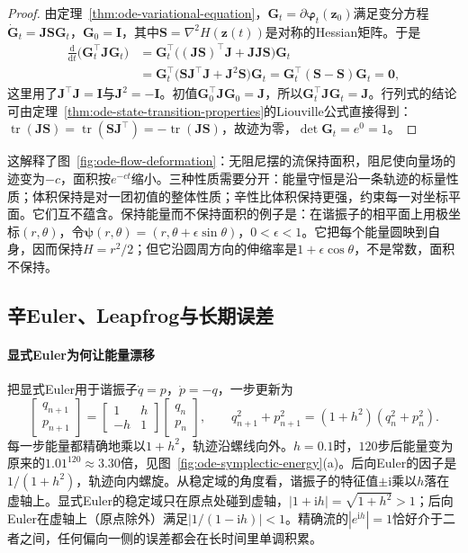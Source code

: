 \begin{proof}
  由定理~\ref{thm:ode-variational-equation}，$\bm G_t=\partial\bm\varphi_t(\bm z_0)$满足变分方程$\dot{\bm G}_t=\bm J\bm S\bm G_t$，$\bm G_0=\bm I$，其中$\bm S=\nabla^2H(\bm z(t))$是对称的Hessian矩阵。于是
  \[
    \begin{aligned}
    \frac{\mathrm d}{\mathrm dt}\bigl(\bm G_t^\top\bm J\bm G_t\bigr)&=\bm G_t^\top\bigl((\bm J\bm S)^\top\bm J+\bm J\bm J\bm S\bigr)\bm G_t\\
    &=\bm G_t^\top\bigl(\bm S\bm J^\top\bm J+\bm J^2\bm S\bigr)\bm G_t=\bm G_t^\top(\bm S-\bm S)\bm G_t=\bm0,
    \end{aligned}
  \]
  这里用了$\bm J^\top\bm J=\bm I$与$\bm J^2=-\bm I$。初值$\bm G_0^\top\bm J\bm G_0=\bm J$，所以$\bm G_t^\top\bm J\bm G_t=\bm J$。行列式的结论可由定理~\ref{thm:ode-state-transition-properties}的Liouville公式直接得到：$\operatorname{tr}(\bm J\bm S)=\operatorname{tr}(\bm S\bm J^\top)=-\operatorname{tr}(\bm J\bm S)$，故迹为零，$\det\bm G_t=e^0=1$。
\end{proof}

这解释了图~\ref{fig:ode-flow-deformation}：无阻尼摆的流保持面积，阻尼使向量场的迹变为$-c$，面积按$e^{-ct}$缩小。三种性质需要分开：能量守恒是沿一条轨迹的标量性质；体积保持是对一团初值的整体性质；辛性比体积保持更强，约束每一对坐标平面。它们互不蕴含。保持能量而不保持面积的例子是：在谐振子的相平面上用极坐标$(r,\theta)$，令$\bm\psi(r,\theta)=(r,\theta+\epsilon\sin\theta)$，$0<\epsilon<1$。它把每个能量圆映到自身，因而保持$H=r^2/2$；但它沿圆周方向的伸缩率是$1+\epsilon\cos\theta$，不是常数，面积不保持。

\subsection{辛Euler、Leapfrog与长期误差}
\label{sec:ode-symplectic-integrators}

\paragraph{显式Euler为何让能量漂移}
把显式Euler用于谐振子$\dot q=p$，$\dot p=-q$，一步更新为
\[
  \begin{bmatrix}q_{n+1}\\p_{n+1}\end{bmatrix}=\begin{bmatrix}1&h\\-h&1\end{bmatrix}\begin{bmatrix}q_n\\p_n\end{bmatrix},
  \qquad q_{n+1}^2+p_{n+1}^2=(1+h^2)(q_n^2+p_n^2).
\]
每一步能量都精确地乘以$1+h^2$，轨迹沿螺线向外。$h=0.1$时，$120$步后能量变为原来的$1.01^{120}\approx3.30$倍，见图~\ref{fig:ode-symplectic-energy}(a)。后向Euler的因子是$1/(1+h^2)$，轨迹向内螺旋。从稳定域的角度看，谐振子的特征值$\pm\mathrm i$乘以$h$落在虚轴上。显式Euler的稳定域只在原点处碰到虚轴，$|1+\mathrm ih|=\sqrt{1+h^2}>1$；后向Euler在虚轴上（原点除外）满足$|1/(1-\mathrm ih)|<1$。精确流的$|e^{\mathrm ih}|=1$恰好介于二者之间，任何偏向一侧的误差都会在长时间里单调积累。

